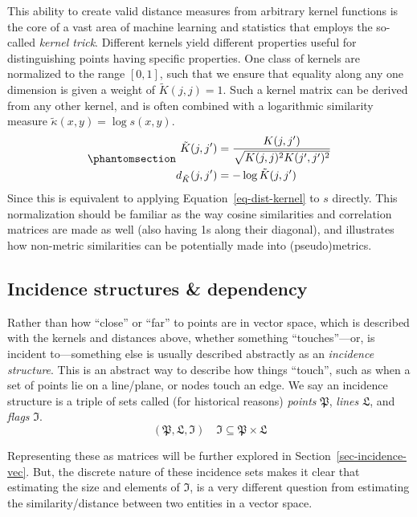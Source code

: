 \documentclass[%
	12pt,
		oneside,
		letterpaper
]{book}
\begin{document}
This ability to create valid distance measures from arbitrary kernel functions is the core of a vast area of machine learning and statistics that employs the so-called \emph{kernel trick}. \autocite{Patternrecognition_Theodoridis2010}
Different kernels yield different properties useful for distinguishing points having specific properties.
One class of kernels are normalized to the range \([0,1]\), such that we ensure that equality along any one dimension is given a weight of \(\tilde{K}(j,j)=1\).
Such a kernel matrix can be derived from any other kernel, and is often combined with a logarithmic similarity measure \(\tilde{\kappa}(x,y)=\log{s(x,y)}\).
\begin{equation}\phantomsection\label{eq-norm-diag}{
\begin{aligned}
\tilde{K}(j,j') &= \frac{K(j,j')}{\sqrt{K(j,j)^2K(j',j')^2}}\\
d_{\tilde{K}}(j,j') &= -\log{\tilde{K}(j,j')}
\end{aligned}
}\end{equation}
Since this is equivalent to applying Equation~\ref{eq-dist-kernel} to \(s\) directly.
This normalization should be familiar as the way cosine similarities and correlation matrices are made as well (also having 1s along their diagonal), and illustrates how non-metric similarities can be potentially made into (pseudo)metrics.

\subsection{Incidence structures \& dependency}\label{incidence-structures-dependency}

Rather than how ``close'' or ``far'' to points are in vector space, which is described with the kernels and distances above, whether something ``touches''---or, is incident to---something else is usually described abstractly as an \emph{incidence structure}.
This is an abstract way to describe how things ``touch'', such as when a set of points lie on a line/plane, or nodes touch an edge.
We say an incidence structure is a triple of sets called (for historical reasons) \emph{points} \(\mathfrak{P}\), \emph{lines} \(\mathfrak{L}\), and \emph{flags} \(\mathfrak{I}\).\autocite{Incidencegeometry_Moorhouse2007}
\[(\mathfrak{P,L,I})\quad \mathfrak{I}\subseteq \mathfrak{P}\times\mathfrak{L}\]

Representing these as matrices will be further explored in Section~\ref{sec-incidence-vec}.
But, the discrete nature of these incidence sets makes it clear that estimating the size and elements of \(\mathfrak{I}\), is a very different question from estimating the similarity/distance between two entities in a vector space.
\end{document}
